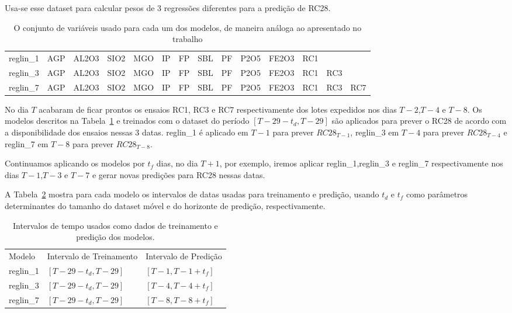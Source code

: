 Usa-se esse dataset para calcular pesos de 3 regressões diferentes para a predição de RC28.


\begin{table}[]
  \centering 
  \begin{tabular}{llllllllllllll}
    \toprule
    reglin\_1 &  AGP &  AL2O3 &  SIO2 &  MGO &  IP &  FP &  SBL &  PF &  P2O5 &  FE2O3 &  RC1 &      &      \\
    reglin\_3 &  AGP &  AL2O3 &  SIO2 &  MGO &  IP &  FP &  SBL &  PF &  P2O5 &  FE2O3 &  RC1 &  RC3 &      \\
    reglin\_7 &  AGP &  AL2O3 &  SIO2 &  MGO &  IP &  FP &  SBL &  PF &  P2O5 &  FE2O3 &  RC1 &  RC3 &  RC7 \\
    \bottomrule
  \end{tabular}
  \caption{O conjunto de variáveis usado para cada um dos modelos, de maneira análoga ao apresentado no trabalho \cite{grecialin}}
  \label{tab:modelslin}
\end{table}


No dia $T$ acabaram de ficar prontos os ensaios RC1, RC3 e RC7 respectivamente
dos lotes expedidos nos dias $T-2$,$T-4$ e $T-8$. Os modelos descritos na 
Tabela~\ref{tab:modelslin} e treinados com o dataset do período 
$[T-29-t_d,T-29]$ são aplicados para prever o RC28 de acordo com a
disponibilidade dos ensaios nessas 3 datas. reglin\_1 é aplicado em $T-1$
para prever $RC28_{T-1}$,
reglin\_3 em $T-4$ para prever $RC28_{T-4}$ e reglin\_7 em $T-8$ para prever
$RC28_{T-8}$.

Continuamos aplicando os modelos por $t_f$ dias,
no dia $T+1$, por exemplo, iremos aplicar reglin\_1,reglin\_3 e
reglin\_7 respectivamente nos dias $T-1$,$T-3$ e $T-7$ e gerar novas predições
para RC28 nessas datas.  

A Tabela~\ref{tab:ranges} mostra para cada modelo os intervalos de
datas usadas para treinamento e predição, usando $t_d$ e $t_f$ como parâmetros
determinantes do tamanho do dataset móvel e do horizonte de predição, respectivamente.


\begin{table}[]
  \centering 
  \begin{tabular}{lll}
    Modelo    & Intervalo de Treinamento & Intervalo de Predição \\
    reglin\_1 & $[T-29-t_d,T-29]$        & $[T-1, T-1+t_f]$      \\
    reglin\_3 &  $[T-29-t_d,T-29]$       &  $[T-4, T-4+t_f]$      \\
    reglin\_7 &   $[T-29-t_d,T-29]$      &   $[T-8, T-8+t_f]$       
  \end{tabular}
  \caption{Intervalos de tempo usados como dados de treinamento e predição dos modelos.}
  \label{tab:ranges}
\end{table}


